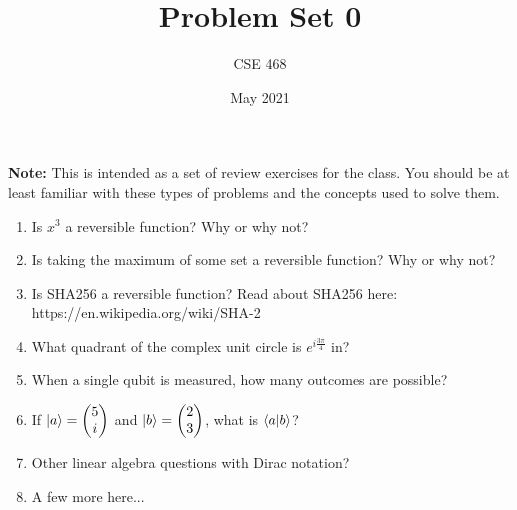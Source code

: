 \documentclass[12pt]{article}
\title{Problem Set 0}
\author{CSE 468}
\date{May 2021}
\begin{document}
\maketitle

\noindent \textbf{Note:} This is intended as a set of review exercises for the class. You should be at least familiar with these types of problems and the concepts used to solve them.

\begin{enumerate}[font=\bfseries]
    \item Is $x^3$ a reversible function? Why or why not?
    \item Is taking the maximum of some set a reversible function?  Why or why not?
    \item Is SHA256 a reversible function? Read about SHA256 here: \newline https://en.wikipedia.org/wiki/SHA-2
    \item What quadrant of the complex unit circle is $e^{i\frac{3\pi}{4}}$ in?
    \item When a single qubit is measured, how many outcomes are possible?
    \item If $\ket{a} = \begin{pmatrix}5 \\ i \end{pmatrix}$ and $\ket{b} = \begin{pmatrix}2 \\ 3 \end{pmatrix}$, what is $\braket{a|b}$?
    \item Other linear algebra questions with Dirac notation?
    \item A few more here...
    
\end{enumerate}
\end{document}
